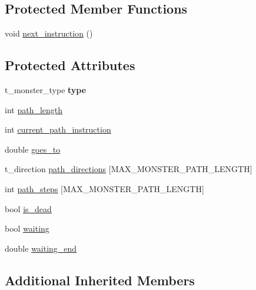 \subsection*{Protected Member Functions}
\begin{DoxyCompactItemize}
\item 
void \hyperlink{classc__monster__character_a7e18086daeeb6d96c0993ce2edf84f00}{next\-\_\-instruction} ()
\end{DoxyCompactItemize}
\subsection*{Protected Attributes}
\begin{DoxyCompactItemize}
\item 
\hypertarget{classc__monster__character_a40b514f9d091ee513c10e2d9b57bb3e5}{t\-\_\-monster\-\_\-type {\bfseries type}}\label{classc__monster__character_a40b514f9d091ee513c10e2d9b57bb3e5}

\item 
int \hyperlink{classc__monster__character_a2ccaf3ff00ff2370eac007960bd01d7b}{path\-\_\-length}
\item 
int \hyperlink{classc__monster__character_a26c7d28a5741c7b99caf7ec9acb80872}{current\-\_\-path\-\_\-instruction}
\item 
double \hyperlink{classc__monster__character_a4918cf31bdf7a308f57cc924fd48cd49}{goes\-\_\-to}
\item 
t\-\_\-direction \hyperlink{classc__monster__character_a6182d1b0f70221c2fdde578cdee0d6e2}{path\-\_\-directions} \mbox{[}M\-A\-X\-\_\-\-M\-O\-N\-S\-T\-E\-R\-\_\-\-P\-A\-T\-H\-\_\-\-L\-E\-N\-G\-T\-H\mbox{]}
\item 
int \hyperlink{classc__monster__character_ab4531ab1220b9a52fd07b290350bba05}{path\-\_\-steps} \mbox{[}M\-A\-X\-\_\-\-M\-O\-N\-S\-T\-E\-R\-\_\-\-P\-A\-T\-H\-\_\-\-L\-E\-N\-G\-T\-H\mbox{]}
\item 
bool \hyperlink{classc__monster__character_abea3e334122c075498889efb7a476b58}{is\-\_\-dead}
\item 
bool \hyperlink{classc__monster__character_ad751b3e9f92c8b0496bd936c66a7598c}{waiting}
\item 
double \hyperlink{classc__monster__character_a944e8c78c13e1ec2169b59287ea5ef1c}{waiting\-\_\-end}
\end{DoxyCompactItemize}
\subsection*{Additional Inherited Members}


